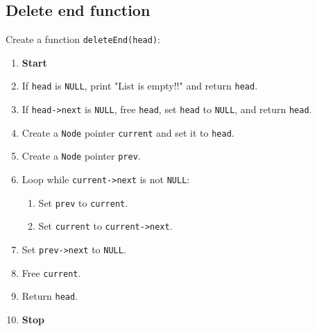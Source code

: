 {  \subsection{Delete end function}
  Create a function \texttt{deleteEnd(head)}:
  \begin{enumerate}[label=\arabic*:,left=0pt]
    \item \textbf{Start}
    \item If \texttt{head} is \texttt{NULL}, print "List is empty!!" and return \texttt{head}.
    \item If \texttt{head->next} is \texttt{NULL}, free \texttt{head}, set \texttt{head} to \texttt{NULL}, and return \texttt{head}.
    \item Create a \texttt{Node} pointer \texttt{current} and set it to \texttt{head}.
    \item Create a \texttt{Node} pointer \texttt{prev}.
    \item Loop while \texttt{current->next} is not \texttt{NULL}:
          \begin{enumerate}[label=2.\arabic*:, start=1]
            \item Set \texttt{prev} to \texttt{current}.
            \item Set \texttt{current} to \texttt{current->next}.
          \end{enumerate}
    \item Set \texttt{prev->next} to \texttt{NULL}.
    \item Free \texttt{current}.
    \item Return \texttt{head}.
    \item \textbf{Stop}
  \end{enumerate}

}
